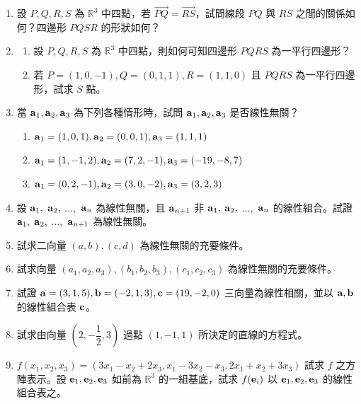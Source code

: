 \begin{enumerate}[label=\arabic*., leftmargin=2em]
  \item 設 $P, Q, R, S$ 為 $\mathbb{R}^3$ 中四點，若 $\vec{PQ} = \vec{RS}$，試問線段 $PQ$ 與 $RS$ 之間的關係如何？四邊形 $PQSR$ 的形狀如何？

  \item
  \begin{enumerate}[label=(\alph*)]
    \item 設 $P, Q, R, S$ 為 $\mathbb{R}^3$ 中四點，則如何可知四邊形 $PQRS$ 為一平行四邊形？
    \item 若 $P=(1, 0, -1), Q=(0, 1, 1), R=(1, 1, 0)$ 且 $PQRS$ 為一平行四邊形，試求 $S$ 點。
  \end{enumerate}

  \item 當 $\boldsymbol{\mathbf{a}}_1, \boldsymbol{\mathbf{a}}_2, \boldsymbol{\mathbf{a}}_3$ 為下列各種情形時，試問 $\boldsymbol{\mathbf{a}}_1, \boldsymbol{\mathbf{a}}_2, \boldsymbol{\mathbf{a}}_3$ 是否線性無關？
  \begin{enumerate}[label=(\alph*)]
    \item $\boldsymbol{\mathbf{a}}_1=(1, 0, 1), \boldsymbol{\mathbf{a}}_2=(0, 0, 1), \boldsymbol{\mathbf{a}}_3=(1, 1, 1)$
    \item $\boldsymbol{\mathbf{a}}_1=(1, -1, 2), \boldsymbol{\mathbf{a}}_2=(7, 2, -1), \boldsymbol{\mathbf{a}}_3=(-19, -8, 7)$
    \item $\boldsymbol{\mathbf{a}}_1=(0, 2, -1), \boldsymbol{\mathbf{a}}_2=(3, 0, -2), \boldsymbol{\mathbf{a}}_3=(3, 2, 3)$
  \end{enumerate}

  \item[\textbf{*16.}] 設 $\boldsymbol{\mathbf{a}}_1,$ $\boldsymbol{\mathbf{a}}_2,$ $\dots,$ $\boldsymbol{\mathbf{a}}_n$ 為線性無關，且 $\boldsymbol{\mathbf{a}}_{n+1}$ 非 $\boldsymbol{\mathbf{a}}_1,$ $\boldsymbol{\mathbf{a}}_2,$ $\dots,$ $\boldsymbol{\mathbf{a}}_n$ 的線性組合。試證 $\boldsymbol{\mathbf{a}}_1,$ $\boldsymbol{\mathbf{a}}_2,$ $\dots,$ $\boldsymbol{\mathbf{a}}_{n+1}$ 為線性無關。

  \item 試求二向量 $(a, b), (c, d)$ 為線性無關的充要條件。

  \item 試求向量 $(a_1, a_2, a_3), (b_1, b_2, b_3), (c_1, c_2, c_3)$ 為線性無關的充要條件。

  \item 試證 $\boldsymbol{\mathbf{a}}=(3, 1, 5), \boldsymbol{\mathbf{b}}=(-2, 1, 3), \boldsymbol{\mathbf{c}}=(19, -2, 0)$ 三向量為線性相關，並以 $\boldsymbol{\mathbf{a}}, \boldsymbol{\mathbf{b}}$ 的線性組合表 $\boldsymbol{\mathbf{c}}$。

  \item 試求由向量 $\left(2, -\dfrac{1}{2}, 3\right)$ 過點 $(1, -1, 1)$ 所決定的直線的方程式。

  \item $f(x_1, x_2, x_3) = (3x_1 - x_2 + 2x_3, x_1 - 3x_2 - x_3, 2x_1 + x_2 + 3x_3)$ 試求 $f$ 之方陣表示。設 $\boldsymbol{\mathbf{e}}_1, \boldsymbol{\mathbf{e}}_2, \boldsymbol{\mathbf{e}}_3$ 如前為 $\mathbb{R}^3$ 的一組基底，試求 $f(\boldsymbol{\mathbf{e}}_i)$ 以 $\boldsymbol{\mathbf{e}}_1, \boldsymbol{\mathbf{e}}_2, \boldsymbol{\mathbf{e}}_3$ 的線性組合表之。


\end{enumerate}
